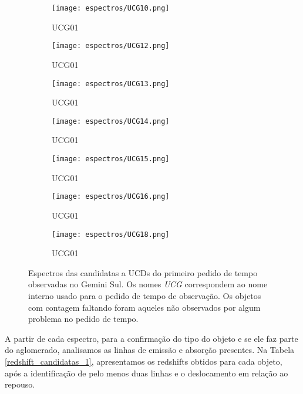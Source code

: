 \begin{figure}[!ht]
    \centering
    \begin{subfigure}[b]{0.45\textwidth}
        \texttt{[image: espectros/UCG10.png]}
        \caption{UCG01}
    \end{subfigure}
    \begin{subfigure}[b]{0.45\textwidth}
        \texttt{[image: espectros/UCG12.png]}
        \caption{UCG01}
    \end{subfigure}
    \begin{subfigure}[b]{0.45\textwidth}
        \texttt{[image: espectros/UCG13.png]}
        \caption{UCG01}
    \end{subfigure}
    \begin{subfigure}[b]{0.45\textwidth}
        \texttt{[image: espectros/UCG14.png]}
        \caption{UCG01}
    \end{subfigure}
    \begin{subfigure}[b]{0.45\textwidth}
        \texttt{[image: espectros/UCG15.png]}
        \caption{UCG01}
    \end{subfigure}
    \begin{subfigure}[b]{0.45\textwidth}
        \texttt{[image: espectros/UCG16.png]}
        \caption{UCG01}
    \end{subfigure}
    \begin{subfigure}[b]{0.45\textwidth}
        \texttt{[image: espectros/UCG18.png]}
        \caption{UCG01}
    \end{subfigure}
    \caption{Espectros das candidatas a UCDs do primeiro pedido de tempo observadas no Gemini Sul. Os nomes \textit{UCG} correspondem ao nome interno usado para o pedido de tempo de observação. Os objetos com contagem faltando foram aqueles não observados por algum problema no pedido de tempo.}
    \label{espectros_candidatas_1_p2}
\end{figure}

A partir de cada espectro, para a confirmação do tipo do objeto e se ele faz parte do aglomerado, analisamos as linhas de emissão e absorção presentes. Na Tabela \ref{redshift_candidatas_1}, apresentamos os redshifts obtidos para cada objeto, após a identificação de pelo menos duas linhas e o deslocamento em relação ao repouso.



